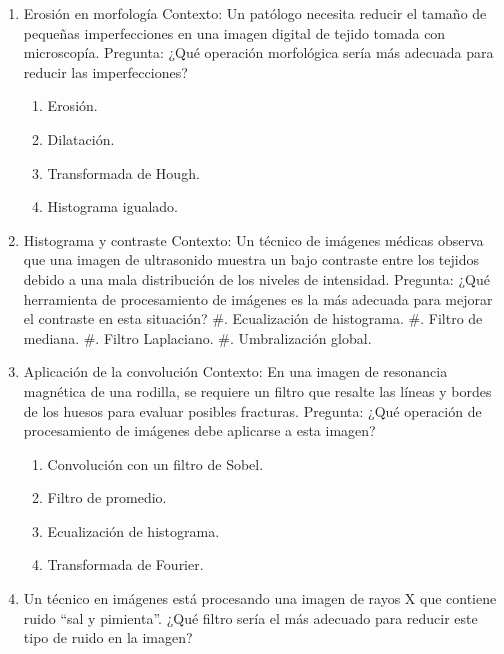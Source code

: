 \documentclass[12pt,a4paper]{article}
\providecommand{\tightlist}{%
  \setlength{\itemsep}{0pt}\setlength{\parskip}{0pt}}\usepackage{longtable,booktabs,array}
\providecommand{\tightlist}{%
  \setlength{\itemsep}{0pt}\setlength{\parskip}{2pt}}
\begin{document}
\setcounter{page}{2} %
\begin{enumerate}
\item
  Erosión en morfología Contexto: Un patólogo necesita reducir el tamaño
  de pequeñas imperfecciones en una imagen digital de tejido tomada con
  microscopía. Pregunta: ¿Qué operación morfológica sería más adecuada
  para reducir las imperfecciones?

  \begin{enumerate}
  \tightlist
  \item
    Erosión.
  \item
    Dilatación.
  \item
    Transformada de Hough.
  \item
    Histograma igualado.
  \end{enumerate}
\item
  Histograma y contraste Contexto: Un técnico de imágenes médicas
  observa que una imagen de ultrasonido muestra un bajo contraste entre
  los tejidos debido a una mala distribución de los niveles de
  intensidad. Pregunta: ¿Qué herramienta de procesamiento de imágenes es
  la más adecuada para mejorar el contraste en esta situación? \#.
  Ecualización de histograma. \#. Filtro de mediana. \#. Filtro
  Laplaciano. \#. Umbralización global.
\item
  Aplicación de la convolución Contexto: En una imagen de resonancia
  magnética de una rodilla, se requiere un filtro que resalte las líneas
  y bordes de los huesos para evaluar posibles fracturas. Pregunta: ¿Qué
  operación de procesamiento de imágenes debe aplicarse a esta imagen?

  \begin{enumerate}
  \tightlist
  \item
    Convolución con un filtro de Sobel.
  \item
    Filtro de promedio.
  \item
    Ecualización de histograma.
  \item
    Transformada de Fourier.
  \end{enumerate}
\item
  Un técnico en imágenes está procesando una imagen de rayos X que
  contiene ruido ``sal y pimienta''. ¿Qué filtro sería el más adecuado
  para reducir este tipo de ruido en la imagen?


\end{enumerate}
\end{document}
